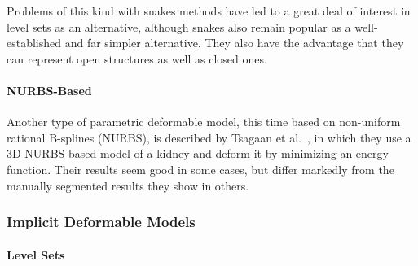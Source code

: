 
Problems of this kind with snakes methods have led to a great deal of interest in level sets as an alternative, although snakes also remain popular as a well-established and far simpler alternative. They also have the advantage that they can represent open structures as well as closed ones.

\paragraph{NURBS-Based}

Another type of parametric deformable model, this time based on non-uniform rational B-splines (NURBS), is described by Tsagaan et al.\ \cite{tsagaan02}, in which they use a 3D NURBS-based model of a kidney and deform it by minimizing an energy function. Their results seem good in some cases, but differ markedly from the manually segmented results they show in others.

\subsubsection{Implicit Deformable Models}

\paragraph{Level Sets}

